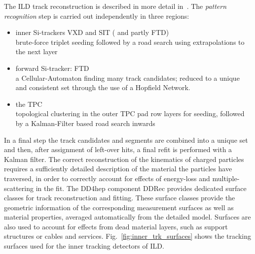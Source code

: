 The ILD track reconstruction is described in more detail in~\cite{Gaede:2014aza}. The \emph{pattern recognition}
step is carried out independently in three regions:
\begin{itemize}
\item inner Si-trackers  VXD and SIT ( and partly FTD)\\
  brute-force triplet seeding followed by a road search using extrapolations to the next layer
\item forward Si-tracker: FTD \\
  a Cellular-Automaton finding many track candidates; reduced to a unique and consistent set through the use of a Hopfield Network.
\item the TPC \\
  topological clustering in the outer TPC pad row layers for seeding, followed by a Kalman-Filter based road search inwards
\end{itemize}
In a final step the track candidates and segments are combined into a unique set and then, after assignment of left-over hits, a final
refit is performed with a Kalman filter.
%
The correct reconstruction of the kinematics of charged particles requires a sufficiently detailed description of the material
the particles have traversed, in order to correctly account for effects of energy-loss and multiple-scattering in the fit.
The DD4hep component DDRec provides dedicated surface classes for track reconstruction and fitting. These surface classes provide the
geometric information of the corresponding measurement surfaces as well as material properties, averaged automatically from
the detailed model. Surfaces are also used to account for effects from dead material layers, such as support structures or cables and services.
Fig.~\ref{fig:inner_trk_surfaces} shows the tracking surfaces used for the inner tracking detectors of ILD.
%
